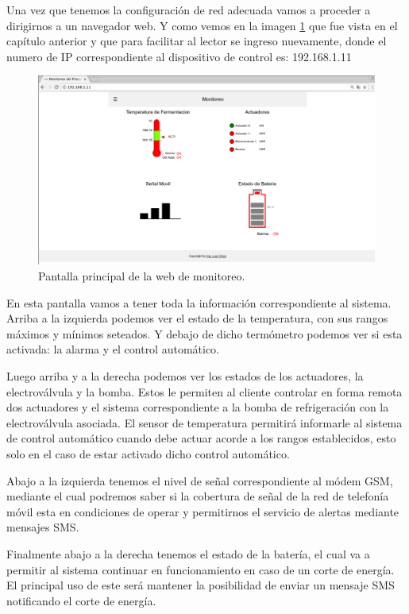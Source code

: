 Una vez que tenemos la configuración de red adecuada vamos a proceder a dirigirnos a un navegador web. Y como vemos en la imagen \ref{fig:web_monitoreo} que fue vista en el capítulo anterior y que para facilitar al lector se ingreso nuevamente, donde el numero de IP correspondiente al dispositivo de control es: 192.168.1.11 

\begin{figure}[h]
  \centering
  \includegraphics[scale=.25]{./Figures/web_monitoreo.png}
  \caption{Pantalla principal de la web de monitoreo.}
  \label{fig:web_monitoreo}
\end{figure}

En esta pantalla vamos a tener toda la información correspondiente al sistema. Arriba a la izquierda podemos ver el estado de la temperatura, con sus rangos máximos y mínimos seteados. Y debajo de dicho termómetro podemos ver si esta activada: la alarma y el control automático.

Luego arriba y a la derecha podemos ver los estados de los actuadores, la electroválvula y la bomba. Estos le permiten al cliente controlar en forma remota dos actuadores y el sistema correspondiente a la bomba de refrigeración con la electroválvula asociada. El sensor de temperatura permitirá informarle al sistema de control automático cuando debe actuar acorde a los rangos establecidos, esto solo en el caso de estar activado dicho control automático. 

Abajo a la izquierda tenemos el nivel de señal correspondiente al módem GSM, mediante el cual podremos saber si la cobertura de señal de la red de telefonía móvil esta en condiciones de operar y permitirnos el servicio de alertas mediante mensajes SMS. 

Finalmente abajo a la derecha tenemos el estado de la batería, el cual va a permitir al sistema continuar en funcionamiento en caso de un corte de energía. El principal uso de este será mantener la posibilidad de enviar un mensaje SMS notificando el corte de energía.

